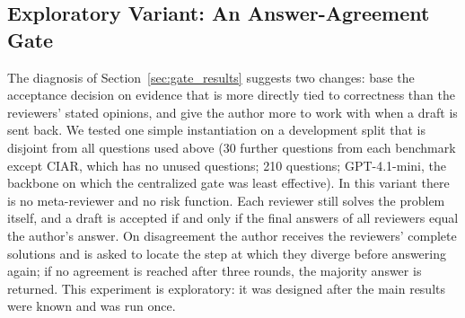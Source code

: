 \subsection{Exploratory Variant: An Answer-Agreement Gate}
\label{sec:pilot}

The diagnosis of Section~\ref{sec:gate_results} suggests two changes: base the acceptance decision on evidence that is more directly tied to correctness than the reviewers' stated opinions, and give the author more to work with when a draft is sent back.
We tested one simple instantiation on a development split that is disjoint from all questions used above (30 further questions from each benchmark except CIAR, which has no unused questions; 210 questions; GPT-4.1-mini, the backbone on which the centralized gate was least effective).
In this variant there is no meta-reviewer and no risk function. Each reviewer still solves the problem itself, and a draft is accepted if and only if the final answers of all reviewers equal the author's answer. On disagreement the author receives the reviewers' complete solutions and is asked to locate the step at which they diverge before answering again; if no agreement is reached after three rounds, the majority answer is returned.
This experiment is exploratory: it was designed after the main results were known and was run once.

\begin{table}[!t]
\caption{Exploratory Comparison on the Development Split (210 Questions, GPT-4.1-mini). Columns as in Table~\ref{tab:gate}.}
\label{tab:pilot}
\centering
\scriptsize
\setlength{\tabcolsep}{2.5pt}
\end{table}

